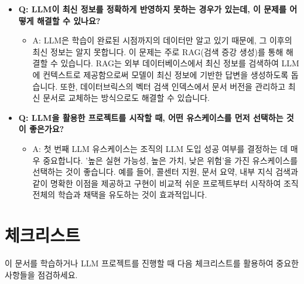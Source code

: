 \documentclass[11pt,a4paper]{article}
\theoremstyle{definition}
\begin{document}
\begin{itemize}
    \item \textbf{Q: LLM이 최신 정보를 정확하게 반영하지 못하는 경우가 있는데, 이 문제를 어떻게 해결할 수 있나요?}
    \begin{itemize}
        \item A: LLM은 학습이 완료된 시점까지의 데이터만 알고 있기 때문에, 그 이후의 최신 정보는 알지 못합니다. 이 문제는 주로 RAG(검색 증강 생성)를 통해 해결할 수 있습니다. RAG는 외부 데이터베이스에서 최신 정보를 검색하여 LLM에 컨텍스트로 제공함으로써 모델이 최신 정보에 기반한 답변을 생성하도록 돕습니다. 또한, 데이터브릭스의 벡터 검색 인덱스에서 문서 버전을 관리하고 최신 문서로 교체하는 방식으로도 해결할 수 있습니다.
    \end{itemize}

    \item \textbf{Q: LLM을 활용한 프로젝트를 시작할 때, 어떤 유스케이스를 먼저 선택하는 것이 좋은가요?}
    \begin{itemize}
        \item A: 첫 번째 LLM 유스케이스는 조직의 LLM 도입 성공 여부를 결정하는 데 매우 중요합니다. '높은 실현 가능성, 높은 가치, 낮은 위험'을 가진 유스케이스를 선택하는 것이 좋습니다. 예를 들어, 콜센터 지원, 문서 요약, 내부 지식 검색과 같이 명확한 이점을 제공하고 구현이 비교적 쉬운 프로젝트부터 시작하여 조직 전체의 학습과 채택을 유도하는 것이 효과적입니다.
    \end{itemize}
\end{itemize}

\newpage
\section{체크리스트}

이 문서를 학습하거나 LLM 프로젝트를 진행할 때 다음 체크리스트를 활용하여 중요한 사항들을 점검하세요.
\end{document}
